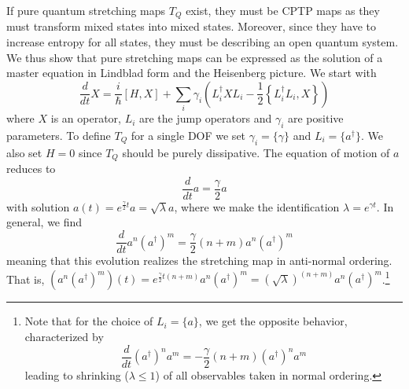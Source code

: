 \documentclass{article}
\begin{document}
If pure quantum stretching maps $T_Q$ exist, they must be CPTP maps as they must transform mixed states into mixed states. Moreover, since they have to increase entropy for all states, they must be describing an open quantum system. We thus show that pure stretching maps can be expressed as the solution of a master equation in Lindblad form and the Heisenberg picture. We start with
\begin{equation}
	\frac{d}{d t} X=\frac{i}{\hbar}[H,X]+\sum_i \gamma_i \left(L_i^\dagger X L_i-\frac{1}{2}\left\{L_i^\dagger L_i,X\right\}\right)
\end{equation}
where $X$ is an operator, $L_i$ are the jump operators and $\gamma_i$ are positive parameters. To define $T_Q$ for a single DOF we set $\gamma_i=\{\gamma\}$ and $L_i=\{a^\dagger\}$. We also set $H=0$ since $T_Q$ should be purely dissipative. The equation of motion of $a$ reduces to
\begin{equation}
	\frac{d}{d t} a=\frac{\gamma}{2} a
\end{equation}
with solution $a(t)=e^{\frac{\gamma}{2} t} a = \sqrt{\lambda} a$, where we make the identification $\lambda=e^{\gamma t}$. 
In general, we find
\begin{equation}
	\frac{d}{d t} a^n (a^{\dagger})^m=\frac{\gamma}{2}(n+m)a^n (a^{\dagger})^m
\end{equation}
meaning that this evolution realizes the stretching map in anti-normal ordering. That is, $(a^n (a^{\dagger})^m)(t)=e^{\frac{\gamma}{2} t (n+m)} a^n (a^{\dagger})^m = (\sqrt{\lambda})^{(n+m)} a^n (a^{\dagger})^m$.\footnote{Note that for the choice of $L_i=\{a\}$, we get the opposite behavior, characterized by
\begin{equation}
	\frac{d}{d t} (a^{\dagger})^n a^m=-\frac{\gamma}{2}(n+m)(a^{\dagger})^n a^m
\end{equation}
leading to shrinking ($\lambda\leq1$) of all observables taken in normal ordering.}
\end{document}
